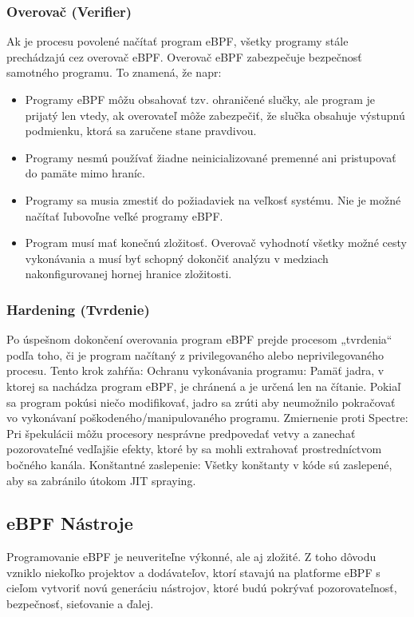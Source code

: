 \subsubsection*{Overovač (Verifier)}
Ak je procesu povolené načítať program eBPF, všetky programy stále prechádzajú cez overovač eBPF. Overovač eBPF zabezpečuje bezpečnosť samotného programu. To znamená, že napr:
\begin{itemize}
\item Programy eBPF môžu obsahovať tzv. ohraničené slučky, ale program je prijatý len vtedy, ak overovateľ môže zabezpečiť, že slučka obsahuje výstupnú podmienku, ktorá sa zaručene stane pravdivou.
\item Programy nesmú používať žiadne neinicializované premenné ani pristupovať do pamäte mimo hraníc.
\item Programy sa musia zmestiť do požiadaviek na veľkosť systému. Nie je možné načítať ľubovoľne veľké programy eBPF.
\item Program musí mať konečnú zložitosť. Overovač vyhodnotí všetky možné cesty vykonávania a musí byť schopný dokončiť analýzu v medziach nakonfigurovanej hornej hranice zložitosti.
\end{itemize}

\subsubsection*{Hardening (Tvrdenie)}
Po úspešnom dokončení overovania program eBPF prejde procesom „tvrdenia“ podľa toho, či je program načítaný z privilegovaného alebo neprivilegovaného procesu. Tento krok zahŕňa:
Ochranu vykonávania programu: 
Pamäť jadra, v ktorej sa nachádza program eBPF, je chránená a je určená len na čítanie. Pokiaľ sa program pokúsi niečo modifikovať, jadro sa zrúti aby neumožnilo pokračovať vo vykonávaní poškodeného/manipulovaného programu.
Zmiernenie proti Spectre: 
Pri špekulácii môžu procesory nesprávne predpovedať vetvy a zanechať pozorovateľné vedľajšie efekty, ktoré by sa mohli extrahovať prostredníctvom bočného kanála.
Konštantné zaslepenie: 
Všetky konštanty v kóde sú zaslepené, aby sa zabránilo útokom JIT spraying.

\subsection{eBPF Nástroje}
Programovanie eBPF je neuveriteľne výkonné, ale aj zložité. Z toho dôvodu vzniklo niekoľko projektov a dodávateľov, ktorí stavajú na platforme eBPF s cieľom vytvoriť novú generáciu nástrojov, ktoré budú pokrývať pozorovateľnosť, bezpečnosť, sieťovanie a ďalej.

